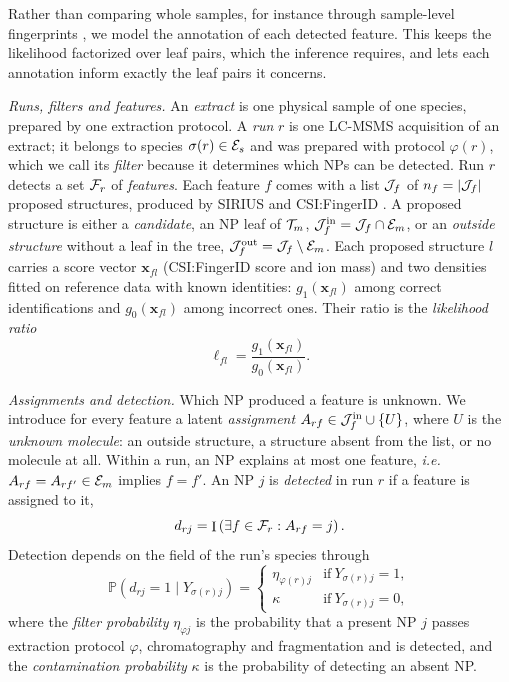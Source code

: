 \documentclass[
11pt, %
oneside, %
english, %
singlespacing, %
headsepline, %
chapterinoneline, %
]{MastersDoctoralThesis} %
\DeclareMathOperator{\Ind}{I}
\def\P{\mathbb{P}}
\def\x{\boldsymbol{x}}
\def\E{{\cal E}}
\def\T{{\cal T}}
\def\F{{\cal F}}
\def\J{{\cal J}}
\def\Jin{\J^{\mathrm{in}}}
\def\Jout{\J^{\mathrm{out}}}
\begin{document}
Rather than comparing whole samples, for instance through sample-level fingerprints \cite{gaudry_2022}, we model the annotation of each detected feature. This keeps the likelihood factorized over leaf pairs, which the inference requires, and lets each annotation inform exactly the leaf pairs it concerns.

\textit{Runs, filters and features.} An \emph{extract} is one physical sample of one species, prepared by one extraction protocol. A \emph{run} $r$ is one LC-MSMS acquisition of an extract; it belongs to species $\sigma(r) \in \E_s$ and was prepared with protocol $\varphi(r)$, which we call its \emph{filter} because it determines which NPs can be detected. Run $r$ detects a set $\F_r$ of \emph{features}. Each feature $f$ comes with a list $\J_f$ of $n_f = |\J_f|$ proposed structures, produced by SIRIUS and CSI:FingerID \cite{duhrkop_2019, duhrkop_2015}. A proposed structure is either a \emph{candidate}, an NP leaf of $\T_m$, $\Jin_f = \J_f \cap \E_m$, or an \emph{outside structure} without a leaf in the tree, $\Jout_f = \J_f \setminus \E_m$. Each proposed structure $l$ carries a score vector $\x_{fl}$ (CSI:FingerID score and ion mass) and two densities fitted on reference data with known identities: $g_1(\x_{fl})$ among correct identifications and $g_0(\x_{fl})$ among incorrect ones. Their ratio is the \emph{likelihood ratio}
\begin{equation*}
	\ell_{fl} = \frac{g_1(\x_{fl})}{g_0(\x_{fl})}.
\end{equation*}

\textit{Assignments and detection.} Which NP produced a feature is unknown. We introduce for every feature a latent \emph{assignment} $A_{rf} \in \Jin_f \cup \{U\}$, where $U$ is the \emph{unknown molecule}: an outside structure, a structure absent from the list, or no molecule at all. Within a run, an NP explains at most one feature, \textit{i.e.} $A_{rf} = A_{rf'} \in \E_m$ implies $f = f'$. An NP $j$ is \emph{detected} in run $r$ if a feature is assigned to it,
\begin{equation*}
	d_{rj} = \Ind\left(\exists f \in \F_r : A_{rf} = j\right).
\end{equation*}
Detection depends on the field of the run's species through
\begin{equation*}
	\P(d_{rj} = 1 \mid Y_{\sigma(r) j}) =
	\begin{cases}
		\eta_{\varphi(r) j} & \mathrm{if\ } Y_{\sigma(r)j} = 1, \\
		\kappa              & \mathrm{if\ } Y_{\sigma(r)j} = 0,
	\end{cases}
\end{equation*}
where the \emph{filter probability} $\eta_{\varphi j}$ is the probability that a present NP $j$ passes extraction protocol $\varphi$, chromatography and fragmentation and is detected, and the \emph{contamination probability} $\kappa$ is the probability of detecting an absent NP.
\end{document}
